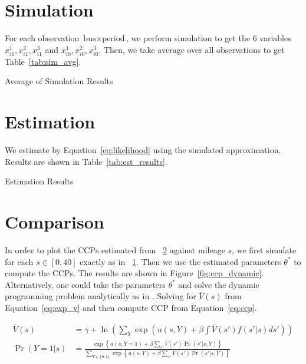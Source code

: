 \documentclass[12pt]{article}[margin=1in]
\begin{document}
\section{Simulation}\label{sec:simulation}
For each observation $\text{bus} \times \text{period}$, we perform simulation
to get the 6 variables $x_{i1}^1,x_{i1}^2,x_{i1}^3$ and
$x_{i0}^1,x_{i0}^2,x_{i0}^3$. Then, we take average over all observations to
get Table~\ref{tab:sim_avg}.

\begin{table}[!htbp]
    \centering
    
    \caption{Average of Simulation Results}
    \label{tab:sim_avg}
\end{table}

\section{Estimation}\label{sec:estimation}
We estimate by Equation~\ref{eq:likelihood} using the simulated approximation.
Results are shown in Table~\ref{tab:est_results}.
\begin{table}[!htbp]
    \centering
    
    \caption{Estimation Results}
    \label{tab:est_results}
\end{table}

\section{Comparison}

In order to plot the CCPs estimated from ~\ref{sec:estimation} against mileage
$s$, we first simulate for each $s\in [0,40]$ exactly as in
~\ref{sec:simulation}. Then we use the estimated parameters $\theta^*$ to
compute the CCPs. The results are shown in Figure~\ref{fig:ccp_dynamic}.
Alternatively, one could take the parameters $\theta^*$ and solve the dynamic
programming problem analytically as in \citet{rust1987optimal}. Solving for
$\bar{V}(s)$ from Equation~\ref{eq:exp_v} and then compute CCP from
Equation~\ref{eq:ccp}.

\begin{align}
    \bar{V}(s) & =\gamma+\ln\left(\sum_{Y} \exp\left(u(s,Y)+\beta\int \bar{V}(s') f(s'|s) ds'\right)\right)                                        \label{eq:exp_v}                                     \\
    \Pr(Y=1|s) & =\frac{\exp\left\{ u(s,Y=1) + \beta \sum_{s'}\bar{V}(s') \Pr(s'|s,Y)\right\}}{\sum_{Y \in \{0,1\}} \exp\left\{ u(s,Y) + \beta \sum_{s'}\bar{V}(s') \Pr(s'|s,Y)\right\}} \label{eq:ccp}
\end{align}
\end{document}
